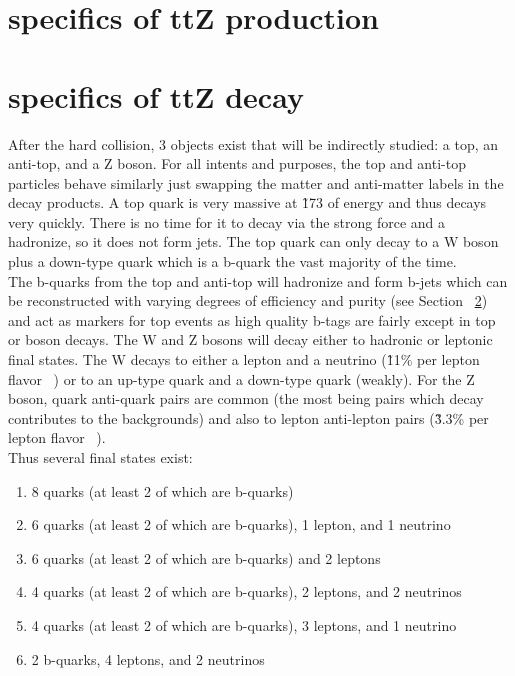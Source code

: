 	\section{specifics of ttZ production}
	\section{specifics of ttZ decay}
	After the hard collision, 3 objects exist that will be indirectly studied: a top, an anti-top, and a Z boson. For all intents and purposes, the top and anti-top particles behave similarly just swapping the matter and anti-matter labels in the decay products. A top quark is very massive at \~ 173 \GeV of energy and thus decays very quickly. There is no time for it to decay via the strong force and a hadronize, so it does not form jets. The top quark can only decay to a W boson plus a down-type quark which is a b-quark the vast majority of the time. \\
	
	The b-quarks from the top and anti-top will hadronize and form b-jets which can be reconstructed with varying degrees of efficiency and purity (see Section ~\ref{}) and act as markers for top events as high quality b-tags are fairly except in top or boson decays. The W and Z bosons will decay either to hadronic or leptonic final states. The W decays to either a lepton and a neutrino (\~ 11\% per lepton flavor ~\cite{PDG}) or to an up-type quark and a down-type quark (weakly). For the Z boson, quark anti-quark pairs are common (the most being \bbbar pairs which decay contributes to the \ttZ backgrounds) and also to lepton anti-lepton pairs (\~ 3.3\% per lepton flavor ~\cite{PDG}).\\
	
	Thus several final states exist:
	\begin{enumerate}
	\item 8 quarks (at least 2 of which are b-quarks)
	\item 6 quarks (at least 2 of which are b-quarks), 1 lepton, and 1 neutrino
	\item 6 quarks (at least 2 of which are b-quarks) and 2 leptons
	\item 4 quarks (at least 2 of which are b-quarks), 2 leptons, and 2 neutrinos
	\item 4 quarks (at least 2 of which are b-quarks), 3 leptons, and 1 neutrino
	\item 2 b-quarks, 4 leptons, and 2 neutrinos
	\end{enumerate}
	
